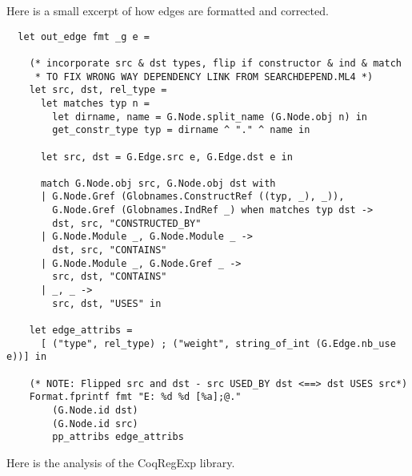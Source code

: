 Here is a small excerpt of how edges are formatted and corrected.

\begin{verbatim}
  let out_edge fmt _g e =

    (* incorporate src & dst types, flip if constructor & ind & match
     * TO FIX WRONG WAY DEPENDENCY LINK FROM SEARCHDEPEND.ML4 *)
    let src, dst, rel_type =
      let matches typ n =
        let dirname, name = G.Node.split_name (G.Node.obj n) in
        get_constr_type typ = dirname ^ "." ^ name in

      let src, dst = G.Edge.src e, G.Edge.dst e in

      match G.Node.obj src, G.Node.obj dst with
      | G.Node.Gref (Globnames.ConstructRef ((typ, _), _)),
        G.Node.Gref (Globnames.IndRef _) when matches typ dst ->
        dst, src, "CONSTRUCTED_BY"
      | G.Node.Module _, G.Node.Module _ ->
        dst, src, "CONTAINS"
      | G.Node.Module _, G.Node.Gref _ ->
        src, dst, "CONTAINS"
      | _, _ ->
        src, dst, "USES" in

    let edge_attribs =
      [ ("type", rel_type) ; ("weight", string_of_int (G.Edge.nb_use e))] in

    (* NOTE: Flipped src and dst - src USED_BY dst <==> dst USES src*)
    Format.fprintf fmt "E: %d %d [%a];@."
        (G.Node.id dst)
        (G.Node.id src)
        pp_attribs edge_attribs
\end{verbatim}

Here is the analysis of the CoqRegExp library.

